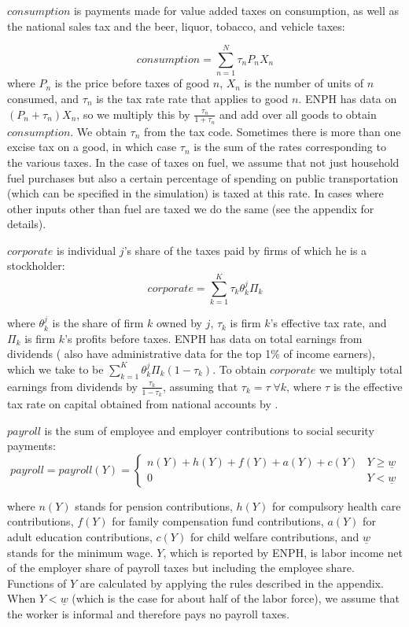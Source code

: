 \documentclass[12pt]{article}
\begin{document}
$consumption$ is payments made for value added taxes on consumption, as well as the national sales tax and the beer, liquor, tobacco, and vehicle taxes:

\begin{equation}
consumption = \sum^{N}_{n=1} \tau_nP_nX_n
\end{equation}
where $P_n$ is the price before taxes of good $n$, $X_n$ is the number of units of $n$ consumed, and $\tau_n$ is the tax rate rate that applies to good $n$.
ENPH has data on $(P_n+\tau_n)X_n$, so we multiply this by $\frac{\tau_n}{1+\tau_n}$ and add over all goods to obtain $consumption$.
We obtain $\tau_n$ from the tax code.
Sometimes there is more than one excise tax on a good, in which case $\tau_n$ is the sum of the rates corresponding to the various taxes.
In the case of taxes on fuel, we assume that not just household fuel purchases but also a certain percentage of spending on public transportation (which can be specified in the simulation) is taxed at this rate.
In cases where other inputs other than fuel are taxed we do the same (see the appendix for details).


$corporate$ is individual $j$'s share of the taxes paid by firms of which he is a stockholder:
\begin{equation}
corporate = \sum^{K}_{k=1} \tau_k\theta^j_k\Pi_k
\end{equation}

where $\theta^j_k$ is the share of firm $k$ owned by $j$, $\tau_k$ is firm $k$'s effective tax rate, and $\Pi_k$ is firm $k$'s profits before taxes.
ENPH has data on total earnings from dividends (\citet{juliana} also have administrative data for the top 1\% of income earners), which we take to be $\sum^{K}_{k=1} \theta^j_k\Pi_k(1-\tau_k)$.
To obtain $corporate$ we multiply total earnings from dividends by $\frac{\tau_k}{1-\tau_k}$, assuming that $\tau_k=\tau \; \forall k$, where $\tau$ is the effective tax rate on capital obtained from national accounts by \citet{banrep}.

$payroll$ is the sum of employee and employer contributions to social security payments:
\begin{equation}
payroll = payroll(Y)=
  \begin{cases}
	n(Y)+h(Y)+f(Y)+a(Y)+c(Y) & Y \geq \underline{w} \\
	0 &  Y < \underline{w}
  \end{cases}
\end{equation}

where  $n(Y)$ stands for pension contributions, $h(Y)$ for compulsory health care contributions, $f(Y)$ for family compensation fund contributions, $a(Y)$ for adult education contributions, $c(Y)$ for child welfare contributions, and  $\underline{w}$ stands for the minimum wage.
$Y$, which is reported by ENPH, is labor income net of the employer share of payroll taxes but including the employee share.
Functions of $Y$ are calculated by applying the rules described in the appendix.
When $Y < \underline{w} $ (which is the case for about half of the labor force), we assume that the worker is informal and therefore pays no payroll taxes.
\end{document}
